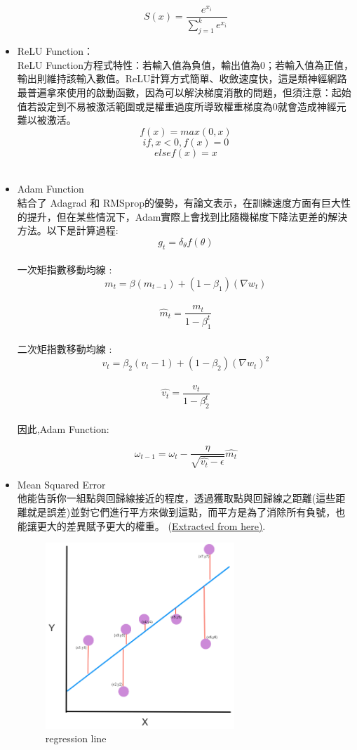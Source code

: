 \documentclass[14pt,a4paper]{report}  %
\begin{document}
\begin{itemize}
$$S(x)=\frac{e^{x_i}}{\sum^k_{j=1}e^{x_i}}$$
\item ReLU Function：\\
ReLU Function方程式特性：若輸入值為負值，輸出值為0；若輸入值為正值，輸出則維持該輸入數值。ReLU計算方式簡單、收斂速度快，這是類神經網路最普遍拿來使用的啟動函數，因為可以解決梯度消散的問題，但須注意：起始值若設定到不易被激活範圍或是權重過度所導致權重梯度為0就會造成神經元難以被激活。
$$f(x)=max(0,x)$$
$$if , x<0 , f(x)=0$$
$$else f(x)=x$$\\
\item Adam Function\\
結合了 Adagrad 和 RMSprop的優勢，有論文表示，在訓練速度方面有巨大性的提升，但在某些情況下，Adam實際上會找到比隨機梯度下降法更差的解決方法。以下是計算過程: \\[6pt]
$$g_t=\delta_{\theta}f(\theta)$$\\
一次矩指數移動均線 :\\[6pt]
 $$m_t =\beta(m_{t-1})+(1-\beta_1)(\nabla{w_t})$$\\
$$\hat m_t=\frac{m_t}{1-\beta_1^t}$$\\[6pt]
二次矩指數移動均線 :\\[6pt]
$$v_t=\beta_2(v_t-1)+(1-\beta_2)(\nabla{w_t})^2$$\\
$$\hat{v_t}=\frac{v_t}{1-\beta_2^t}$$\\
因此,Adam Function:\\[6pt]
\begin{Large}$$\omega_{t-1}=\omega_t-\frac{\eta}{\sqrt{\hat{v_t}-\epsilon}}\hat{m_t}$$\end{Large}
\item Mean Squared Error\\
他能告訴你一組點與回歸線接近的程度，透過獲取點與回歸線之距離(這些距離就是誤差)並對它們進行平方來做到這點，而平方是為了消除所有負號，也能讓更大的差異賦予更大的權重。
(\href{https://www.statisticshowto.com/mean-squared-error/}{\underline{Extracted from here)}}.\\[6pt]
\begin{figure}
\center
\includegraphics[height=7cm]{MSE}
\caption{regression line}
\end{figure}


\end{itemize}
\end{document}
